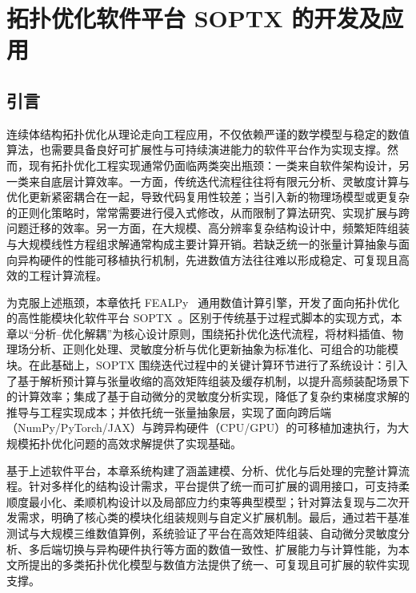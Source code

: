 \chapter{拓扑优化软件平台 SOPTX 的开发及应用}
\label{chap:soptx}


\section{引言}
\label{sec:soptx:intro}

连续体结构拓扑优化从理论走向工程应用，不仅依赖严谨的数学模型与稳定的数值算法，也需要具备良好可扩展性与可持续演进能力的软件平台作为实现支撑。然而，现有拓扑优化工程实现通常仍面临两类突出瓶颈：一类来自软件架构设计，另一类来自底层计算效率。一方面，传统迭代流程往往将有限元分析、灵敏度计算与优化更新紧密耦合在一起，导致代码复用性较差；当引入新的物理场模型或更复杂的正则化策略时，常常需要进行侵入式修改，从而限制了算法研究、实现扩展与跨问题迁移的效率。另一方面，在大规模、高分辨率复杂结构设计中，频繁矩阵组装与大规模线性方程组求解通常构成主要计算开销。若缺乏统一的张量计算抽象与面向异构硬件的性能可移植执行机制，先进数值方法往往难以形成稳定、可复现且高效的工程计算流程。

为克服上述瓶颈，本章依托 FEALPy~\cite{fealpy, zhengFEALPyV3Crossplatform2025a} 通用数值计算引擎，开发了面向拓扑优化的高性能模块化软件平台 SOPTX~\cite{heSOPTXHighperformanceMultibackend2025a}。区别于传统基于过程式脚本的实现方式，本章以“分析--优化解耦”为核心设计原则，围绕拓扑优化迭代流程，将材料插值、物理场分析、正则化处理、灵敏度分析与优化更新抽象为标准化、可组合的功能模块。在此基础上，SOPTX 围绕迭代过程中的关键计算环节进行了系统设计：引入了基于解析预计算与张量收缩的高效矩阵组装及缓存机制，以提升高频装配场景下的计算效率；集成了基于自动微分的灵敏度分析实现，降低了复杂约束梯度求解的推导与工程实现成本；并依托统一张量抽象层，实现了面向跨后端（NumPy/PyTorch/JAX）与跨异构硬件（CPU/GPU）的可移植加速执行，为大规模拓扑优化问题的高效求解提供了实现基础。

基于上述软件平台，本章系统构建了涵盖建模、分析、优化与后处理的完整计算流程。针对多样化的结构设计需求，平台提供了统一而可扩展的调用接口，可支持柔顺度最小化、柔顺机构设计以及局部应力约束等典型模型；针对算法复现与二次开发需求，明确了核心类的模块化组装规则与自定义扩展机制。最后，通过若干基准测试与大规模三维数值算例，系统验证了平台在高效矩阵组装、自动微分灵敏度分析、多后端切换与异构硬件执行等方面的数值一致性、扩展能力与计算性能，为本文所提出的多类拓扑优化模型与数值方法提供了统一、可复现且可扩展的软件实现支撑。


